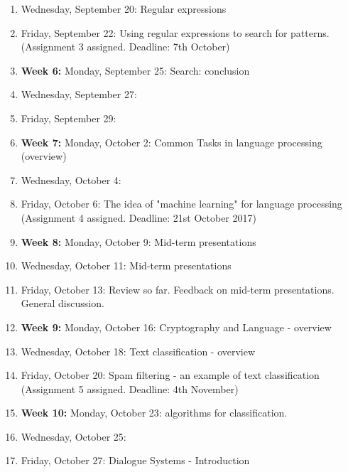 \documentclass[11pt,a4paper]{article}
\begin{document}
\begin{enumerate}
\item Wednesday, September 20: Regular expressions 

\item Friday, September 22:  Using regular expressions to search for patterns. 
(Assignment 3 assigned. Deadline: 7th October)

\item \textbf{Week 6:} Monday, September 25:  Search: conclusion 

\item Wednesday, September 27:   

\item Friday, September 29:

\item \textbf{Week 7:} Monday, October 2:  Common Tasks in language processing (overview)

\item Wednesday, October 4: 

\item Friday, October 6:  The idea of "machine learning" for language processing
(Assignment 4 assigned. Deadline: 21st October 2017) 

\item \textbf{Week 8:} Monday, October 9: Mid-term presentations 

\item Wednesday, October 11: Mid-term presentations 

\item Friday, October 13: Review so far. Feedback on mid-term presentations. General discussion.

\item \textbf{Week 9:} Monday, October 16: Cryptography and Language - overview

\item Wednesday, October 18: Text classification - overview

\item Friday, October 20:  Spam filtering - an example of text classification
\\ (Assignment 5 assigned. Deadline: 4th November)	

\item \textbf{Week 10:} Monday, October 23: algorithms for classification. 

\item Wednesday, October 25: 
 
\item Friday, October 27: Dialogue Systems - Introduction


\end{enumerate}
\end{document}
